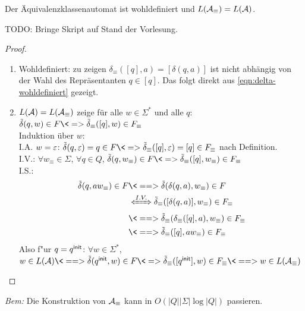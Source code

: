 \begin{Satz}[name={[Äquivalenzklassenautomat ist wohldefiniert]}]
        Der Äquivalenzklassenautomat ist wohldefiniert und $L(\mathcal{A}_\equiv)=L(\mathcal{A})$.
\end{Satz}

TODO: Bringe Skript auf Stand der Vorlesung.

\begin{proof}\ 
        \begin{enumerate}
                \item Wohldefiniert: zu zeigen $\delta_\equiv([q],a) =[\delta(q,a)]$ ist nicht abhängig von der Wahl des Repräsentanten $q\in [q]$. Das folgt direkt aus \autoref{eqn:delta-wohldefiniert} gezeigt.
                \item $L(\mathcal{A})=L(\mathcal{A}_\equiv)$ zeige für alle $w\in\Sigma^*$ und alle $q$: $\tilde\delta(q,w)\in F \<=> \tilde\delta_\equiv([q],w)\in F_\equiv$\\
                Induktion über $w$:\\
                I.A. $w=\varepsilon$: $\tilde\delta(q,\Eps)=q\in F \<=> \tilde\delta_\equiv([q],\Eps)=[q]\in F_\equiv$ nach Definition.\\
                I.V.: $\forall w_\equiv\in\Sigma$, $\forall q\in Q$, $\tilde\delta(q,w_\equiv)\in F \<=> \tilde\delta_\equiv([q],w_\equiv)\in F_\equiv$\\
                I.S.: \begin{align*}
                \tilde\delta(q,aw_\equiv)\in F &\<==> \tilde\delta(\delta(q,a),w_\equiv)\in F\\ &\xLeftrightarrow{I.V.} \tilde\delta_\equiv([\delta(q,a)],w_\equiv)\in F_\equiv\\
                &\<==> \tilde\delta_\equiv(\delta_\equiv([q],a),w_\equiv)\in F_\equiv\\
                &\<==> \tilde\delta_\equiv([q],a w_\equiv)\in F_\equiv
                \end{align*}
                Also f"ur $q={q^\mathsf{init}}$: $\forall w\in\Sigma^*$, $w\in L(\A)\<==> \tilde\delta(\qinit,w) \in F \<=> \tilde\delta_\equiv([\qinit],w) \in F_\equiv \<==> w\in L(\A_\equiv)$
        \end{enumerate}
\end{proof}
\emph{Bem:} Die Konstruktion von $\mathcal{A}_\equiv$ kann in $O(|Q||\Sigma|\log|Q|)$ passieren.

